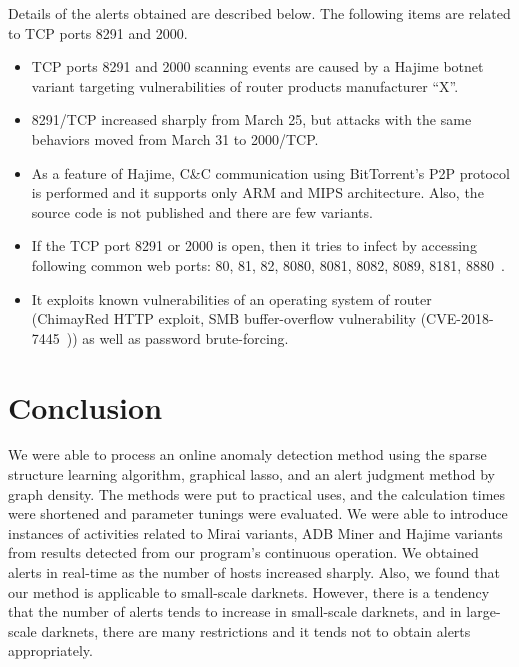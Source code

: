 \documentclass[letterpaper]{sig-alternate-10pt}
\begin{document}
Details of the alerts obtained are described below.
The following items are related to TCP ports 8291 and 2000.
\begin{itemize}
	\item TCP ports 8291 and 2000 scanning events are caused by a Hajime botnet variant targeting vulnerabilities of router products manufacturer ``X''.
	\item 8291/TCP increased sharply from March 25, but attacks with the same behaviors moved from March 31 to 2000/TCP.
	\item As a feature of Hajime, C\&C communication using BitTorrent's P2P protocol is performed and it supports only ARM and MIPS architecture. Also, the source code is not published and there are few variants.
	\item If the TCP port 8291 or 2000 is open, then it tries to infect by accessing following common web ports: 80, 81, 82, 8080, 8081, 8082, 8089, 8181, 8880~\cite{Radware}.
	\item It exploits known vulnerabilities of an operating system of router (ChimayRed HTTP exploit, SMB buffer-overflow vulnerability (CVE-2018-7445~\cite{CVE2})) as well as password brute-forcing.
\end{itemize}


\section{Conclusion}
We were able to process an online anomaly detection method using the sparse structure learning algorithm, graphical lasso, and an alert judgment method by graph density.
The methods were put to practical uses, and the calculation times were shortened and parameter tunings were evaluated.
We were able to introduce instances of activities related to Mirai variants, ADB Miner and Hajime variants from results detected from our program's continuous operation.
We obtained alerts in real-time as the number of hosts increased sharply.
Also, we found that our method is applicable to small-scale darknets.
However, there is a tendency that the number of alerts tends to increase in small-scale darknets, and in large-scale darknets, there are many restrictions and it tends not to obtain alerts appropriately.
\end{document}
